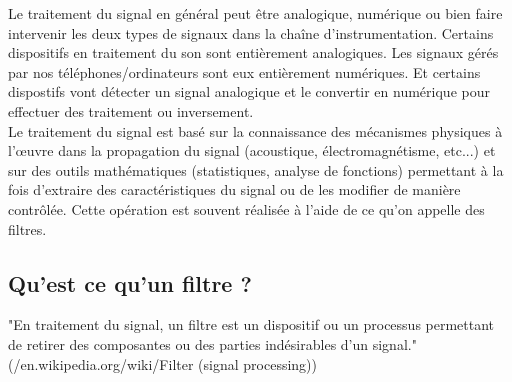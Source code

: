 \documentclass[11pt,a4paper]{article}
\begin{document}
Le traitement du signal en général peut être analogique, numérique ou bien faire intervenir les deux types de signaux dans la chaîne d'instrumentation. Certains dispositifs en traitement du son sont entièrement analogiques. Les signaux gérés par nos téléphones/ordinateurs sont eux entièrement numériques. Et certains dispostifs vont détecter un signal analogique et le convertir en numérique pour effectuer des traitement ou inversement.\\

Le traitement du signal est basé sur la connaissance des mécanismes physiques à l’œuvre dans la propagation du signal (acoustique, électromagnétisme, etc...) et sur des outils mathématiques (statistiques, analyse de fonctions) permettant à la fois d'extraire des caractéristiques du signal ou de les modifier de manière contrôlée. Cette opération est souvent réalisée à l'aide de ce qu'on appelle des filtres. \\ 
 
\subsection{Qu'est ce qu'un filtre ?}
"En traitement du signal, un filtre est un dispositif ou un processus permettant de retirer des composantes ou des parties indésirables d'un signal." (/en.wikipedia.org/wiki/Filter (signal processing))\\

\vspace{0.5cm}

\begin{center}
\end{center}
\end{document}
